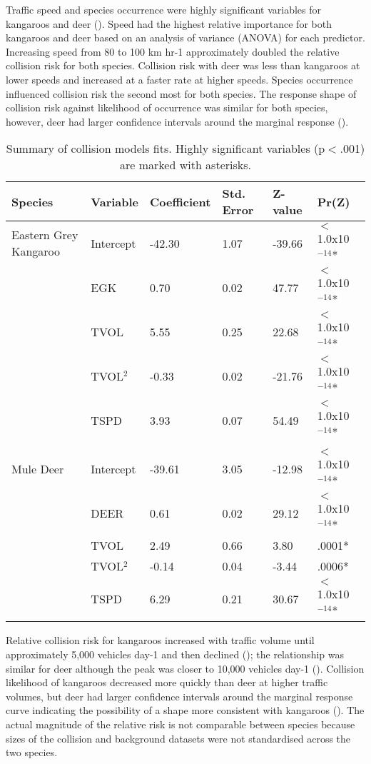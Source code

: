 Traffic speed and species occurrence were highly significant variables for kangaroos and deer (). Speed had the highest relative importance for both kangaroos and deer based on an analysis of variance (ANOVA) for each predictor. Increasing speed from 80 to 100 km hr-1 approximately doubled the relative collision risk for both species.  Collision risk with deer was less than kangaroos at lower speeds and increased at a faster rate at higher speeds. Species occurrence influenced collision risk the second most for both species.  The response shape of collision risk against likelihood of occurrence was similar for both species, however, deer had larger confidence intervals around the marginal response ().

\begin{table}[htp]
\caption[Summary of collision models for kangaroos and deer]{Summary of collision models fits.  Highly significant variables (p$<$.001) are marked with asterisks.}
\begin{tabularx}{0.9\textwidth}{llllll} \toprule
Species					&Variable		&Coefficient	&Std. Error		&Z-value	&Pr(Z) \\ \midrule
Eastern Grey Kangaroo	&Intercept		&-42.30			&1.07			&-39.66		&$<$1.0x10$^{-14}$* \\
						&EGK			&0.70			&0.02			&47.77		&$<$1.0x10$^{-14}$* \\
						&TVOL			&5.55			&0.25			&22.68		&$<$1.0x10$^{-14}$* \\
						&TVOL$^2$		&-0.33			&0.02			&-21.76		&$<$1.0x10$^{-14}$* \\
						&TSPD			&3.93			&0.07			&54.49		&$<$1.0x10$^{-14}$* \\
&&&&& \\
Mule Deer				&Intercept		&-39.61			&3.05			&-12.98		&$<$1.0x10$^{-14}$* \\
						&DEER			&0.61			&0.02			&29.12		&$<$1.0x10$^{-14}$* \\
						&TVOL			&2.49			&0.66			&3.80		&.0001* \\
						&TVOL$^2$		&-0.14			&0.04			&-3.44		&.0006* \\
						&TSPD			&6.29			&0.21			&30.67		&$<$1.0x10$^{-14}$* \\
\bottomrule
\end{tabularx}
\label{cal_model_fits}
\end{table}

Relative collision risk  for kangaroos increased with traffic volume until approximately 5,000 vehicles day-1 and then declined (); the relationship was similar for deer although the peak was closer to 10,000 vehicles day-1 (). Collision likelihood of kangaroos decreased more quickly than deer at higher traffic volumes, but deer had larger confidence intervals around the marginal response curve indicating the possibility of a shape more consistent with kangaroos (). The actual magnitude of the relative risk is not comparable between species because sizes of the collision and background datasets were not standardised across the two species.

